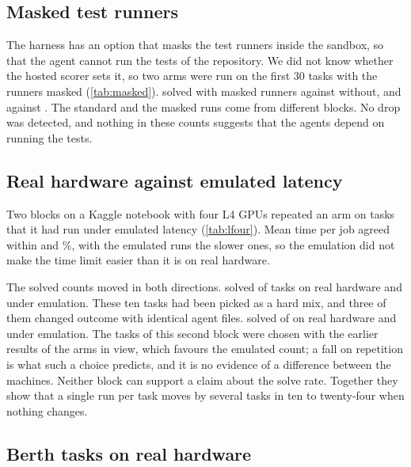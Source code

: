 \subsection{Masked test runners}

The harness has an option that masks the test runners inside the sandbox, so that the agent cannot run the tests of
the repository. We did not know whether the hosted scorer sets it, so two arms were run on the first 30 tasks with the
runners masked (\cref{tab:masked}).  solved \MaskBfMsk{} with masked runners against \MaskBfStd{} without,
and  \MaskShMsk{} against \MaskShStd. The standard and the masked runs come from different blocks. No drop
was detected, and nothing in these counts suggests that the agents depend on running the tests.



\subsection{Real hardware against emulated latency}\label{sec:big-real}

Two blocks on a Kaggle notebook with four L4 GPUs repeated an arm on tasks that it had run under emulated latency
(\cref{tab:lfour}). Mean time per job agreed within \LfourWallDiffFive{} and \LfourWallDiffSix\%, with the emulated
runs the slower ones, so the emulation did not make the time limit easier than it is on real hardware.



The solved counts moved in both directions.  solved \LfourRealFive{} of \LfourNFive{} tasks on real hardware
and \LfourEmuFive{} under emulation. These ten tasks had been picked as a hard mix, and three of them changed outcome
with identical agent files.  solved \LfourRealSix{} of \LfourNSix{} on real hardware and \LfourEmuSix{}
under emulation. The \LfourNSix{} tasks of this second block were chosen with the earlier results of the arms in view,
which favours the emulated count; a fall on repetition is what such a choice predicts, and it is no evidence of a
difference between the machines. Neither block can support a claim about the solve rate. Together they show that a
single run per task moves by several tasks in ten to twenty-four when nothing changes.

\subsection{Berth tasks on real hardware}

